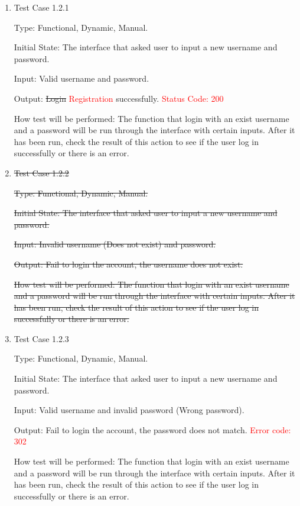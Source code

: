 \documentclass[12pt, titlepage]{article}
\begin{document}
\begin{enumerate}

\item{Test Case 1.2.1\\}

Type: Functional, Dynamic, Manual.
					
Initial State: The interface that asked user to input a new username and password.
					
Input: Valid username and password.
					
Output: \st{Login} \textcolor{red}{Registration}  successfully. \textcolor{red}{Status Code: 200}
					
How test will be performed: The function that login with an exist username and a password will be run through the interface with certain inputs. After it has been run, check the result of this action to see if the user log in successfully or there is an error.

\item{ \st{ Test Case 1.2.2} \\}

\st{ Type: Functional, Dynamic, Manual.}
					
\st{Initial State: The interface that asked user to input a new username and password.}
					
\st{Input: Invalid username (Does not exist) and password.}
					
\st{Output: Fail to login the account, the username does not exist.}
					
\st{How test will be performed: The function that login with an exist username and a password will be run through the interface with certain inputs. After it has been run, check the result of this action to see if the user log in successfully or there is an error.}

\item{Test Case 1.2.3\\}

Type: Functional, Dynamic, Manual.
					
Initial State: The interface that asked user to input a new username and password.
					
Input: Valid username and invalid password (Wrong password).
					
Output: Fail to login the account, the password does not match. \textcolor{red}{Error code: 302}
					
How test will be performed: The function that login with an exist username and a password will be run through the interface with certain inputs. After it has been run, check the result of this action to see if the user log in successfully or there is an error.

\end{enumerate}
\end{document}
